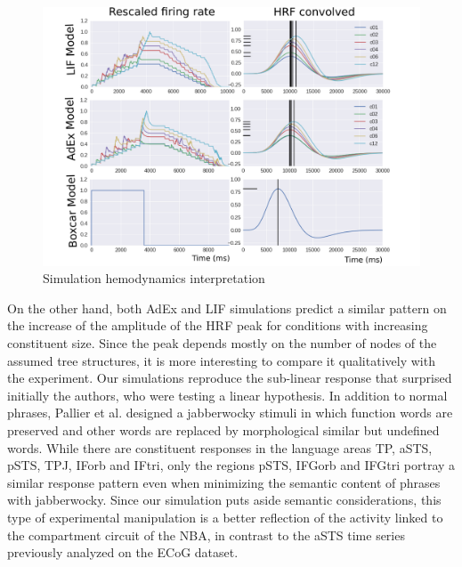 \documentclass[10pt]{article}
\begin{document}
\begin{figure}[h!]
  \begin{center}
    \includegraphics[width=1.00\columnwidth]{figures/pnas_comparison01/pnas_comparison01}
    \caption{{Simulation hemodynamics interpretation {\label{473368}}%
      }}
  \end{center}
\end{figure}

On the other hand, both AdEx and LIF simulations predict a similar pattern on the increase of the amplitude of the HRF peak for conditions with increasing constituent size.
Since the peak depends mostly on the number of nodes of the assumed tree structures, it is more interesting to compare it qualitatively with the experiment.
Our simulations reproduce the sub-linear response that surprised initially the authors, who were testing a linear hypothesis.
In addition to normal phrases, Pallier et al. designed a jabberwocky stimuli in which function words are preserved and other words are replaced by morphological similar but undefined words.
While there are constituent responses in the language areas TP, aSTS, pSTS, TPJ, IForb and IFtri, only the regions pSTS, IFGorb and IFGtri portray a similar response pattern even when minimizing the semantic content of phrases with jabberwocky.
Since our simulation puts aside semantic considerations, this type of experimental manipulation is a better reflection of the activity linked to the compartment circuit of the NBA, in contrast to the aSTS time series previously analyzed on the ECoG dataset.
\end{document}
